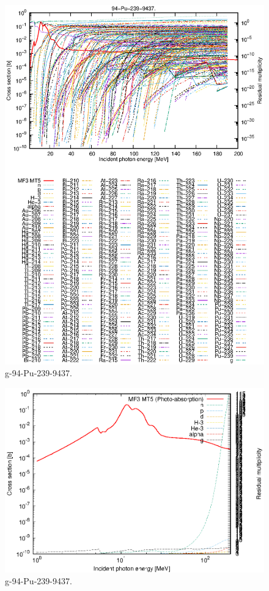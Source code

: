 \begin{figure}
 \includegraphics[width=\linewidth]{eps/g_94-Pu-239_9437.eps}
  \caption{g-94-Pu-239-9437.}
\end{figure}
\newpage \clearpage

\begin{figure}
 \includegraphics[width=\linewidth]{eps-log/g_94-Pu-239_9437.eps}
 \caption{g-94-Pu-239-9437.}
\end{figure}
\newpage \clearpage

